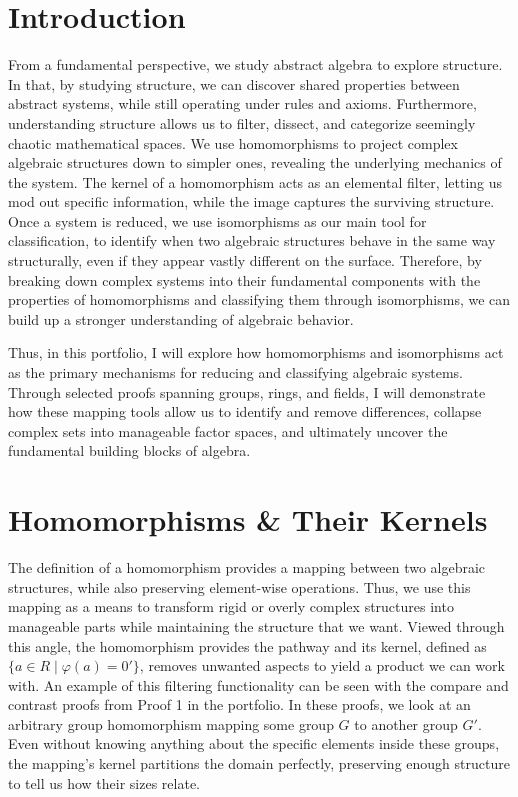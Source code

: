 \section{Introduction}

From a fundamental perspective, we study abstract algebra to explore structure. In that, by studying structure, we can discover shared properties between abstract systems, while still operating under rules and axioms. Furthermore, understanding structure allows us to filter, dissect, and categorize seemingly chaotic mathematical spaces. We use homomorphisms to project complex algebraic structures down to simpler ones, revealing the underlying mechanics of the system. The kernel of a homomorphism acts as an elemental filter, letting us mod out specific information, while the image captures the surviving structure. Once a system is reduced, we use isomorphisms as our main tool for classification, to identify when two algebraic structures behave in the same way structurally, even if they appear vastly different on the surface. Therefore, by breaking down complex systems into their fundamental components with the properties of homomorphisms and classifying them through isomorphisms, we can build up a stronger understanding of algebraic behavior.  

Thus, in this portfolio, I will explore how homomorphisms and isomorphisms act as the primary mechanisms for reducing and classifying algebraic systems. Through selected proofs spanning groups, rings, and fields, I will demonstrate how these mapping tools allow us to identify and remove differences, collapse complex sets into manageable factor spaces, and ultimately uncover the fundamental building blocks of algebra.


\section{Homomorphisms \& Their Kernels}

The definition of a homomorphism provides a mapping between two algebraic structures, while also preserving element-wise operations. Thus, we use this mapping as a means to transform rigid or overly complex structures into manageable parts while maintaining the structure that we want. Viewed through this angle, the homomorphism provides the pathway and its kernel, defined as \(\{a \in R \mid \varphi(a) = 0'\}\),  removes unwanted aspects to yield a product we can work with. An example of this filtering functionality can be seen with the compare and contrast proofs from Proof 1 in the portfolio. In these proofs, we look at an arbitrary group homomorphism mapping some group \(G\) to another group \(G'\). Even without knowing anything about the specific elements inside these groups, the mapping's kernel partitions the domain perfectly, preserving enough structure to tell us how their sizes relate.

